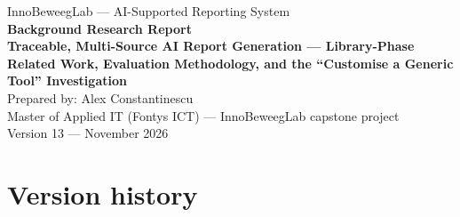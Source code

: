 \documentclass[11pt,a4paper]{article}
\begin{document}
\begin{titlepage}
\centering
\vspace*{1.5cm}
{\small InnoBeweegLab --- AI-Supported Reporting System}\\[1.2cm]
{\color{navy}\Huge\bfseries Background Research Report}\\[0.7cm]
{\color{teal}\Large\bfseries Traceable, Multi-Source AI Report Generation --- Library-Phase Related Work, Evaluation Methodology, and the ``Customise a Generic Tool'' Investigation}\\[1.8cm]
{\large Prepared by: Alex Constantinescu}\\[0.3cm]
{\large Master of Applied IT (Fontys ICT) --- InnoBeweegLab capstone project}\\[0.3cm]
{\large Version 13 --- November 2026}
\vfill
\end{titlepage}


\section*{Version history}


\clearpage
\tableofcontents

\clearpage
{}


\clearpage

\clearpage

\clearpage

\clearpage

\clearpage

\clearpage

\end{document}
